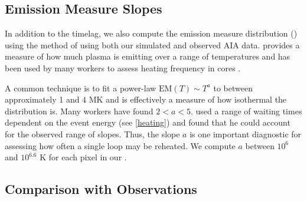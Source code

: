 


\subsection{Emission Measure Slopes}

In addition to the timelag, we also compute the emission measure distribution (\dem) using the method of \citet{hannah_differential_2012} using both our simulated and observed AIA data. \dem provides a measure of how much plasma is emitting over a range of temperatures and has been used by many workers to assess heating frequency in \AR cores \citep[][and references therein]{tripathi_emission_2011,warren_constraints_2011,warren_systematic_2012,schmelz_cold_2012,bradshaw_diagnosing_2012,reep_diagnosing_2013,barnes_inference_2016,barnes_inference_2016,barnes_inference_2016-1}. 

A common technique is to fit a power-law $\mathrm{EM}(T)\sim T^a$ to \dem between approximately 1 and 4 MK and is effectively a measure of how isothermal the distribution is. Many workers \citep[see Table 3 of][and references therein]{bradshaw_diagnosing_2012} have found $2<a<5$. \citet{cargill_active_2014} used a range of waiting times dependent on the event energy (see \autoref{heating}) and found that he could account for the observed range of slopes. Thus, the \dem slope $a$ is one important diagnostic for assessing how often a single loop may be reheated. We compute $a$ between $10^6$ and $10^{6.6}$ K for each pixel in our \AR.


\subsection{Comparison with Observations}\label{compare_obs}

